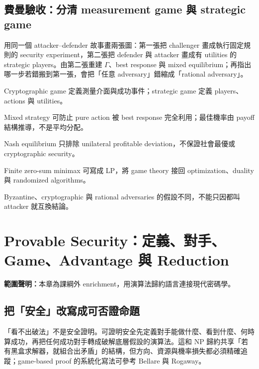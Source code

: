 \documentclass[11pt,a4paper,oneside,openany]{book}
\begin{document}
\section{費曼驗收：分清 measurement game 與 strategic game}
\begin{feynmancheck}
用同一個 attacker–defender 故事畫兩張圖：第一張把 challenger 畫成執行固定規則的 security experiment，第二張把 defender 與 attacker 畫成有 utilities 的 strategic players。由第二張重建 $\Gamma$、best response 與 mixed equilibrium；再指出哪一步若錯搬到第一張，會把「任意 adversary」錯縮成「rational adversary」。
\end{feynmancheck}
\begin{chapterrecap}
\item Cryptographic game 定義測量介面與成功事件；strategic game 定義 players、actions 與 utilities。
\item Mixed strategy 可防止 pure action 被 best response 完全利用；最佳機率由 payoff 結構推導，不是平均分配。
\item Nash equilibrium 只排除 unilateral profitable deviation，不保證社會最優或 cryptographic security。
\item Finite zero-sum minimax 可寫成 LP，將 game theory 接回 optimization、duality 與 randomized algorithms。
\item Byzantine、cryptographic 與 rational adversaries 的假設不同，不能只因都叫 attacker 就互換結論。
\end{chapterrecap}

\chapter{Provable Security：定義、對手、Game、Advantage 與 Reduction}
\label{app:provable-security}
\noindent\textbf{範圍聲明：}本章為課綱外 enrichment，用演算法歸約語言連接現代密碼學。

\section{把「安全」改寫成可否證命題}
「看不出破法」不是安全證明。可證明安全先定義對手能做什麼、看到什麼、何時算成功，再把任何成功對手轉成破解底層假設的演算法。這和 NP 歸約共享「若有黑盒求解器，就組合出矛盾」的結構，但方向、資源與機率損失都必須精確追蹤；game-based proof 的系統化寫法可參考 Bellare 與 Rogaway\cite{bellare-rogaway-games}。
\end{document}
